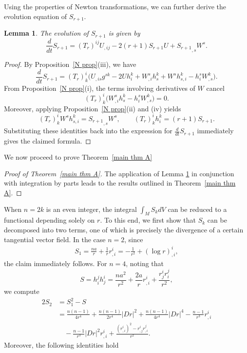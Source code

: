 \documentclass[reqno,11pt, letterpaper]{amsart}
\theoremstyle{plain}
\newtheorem{lem}[thm]{Lemma}
\theoremstyle{definition}
\numberwithin{equation}{section}
\begin{document}
Using the properties of Newton transformations, we can further derive the evolution equation of  $S_{r+1}$.
\begin{lem}\label{lem-evo-S}
	The evolution of $S_{r+1}$ is given by
	\[
	\frac{d}{dt} S_{r+1} = (T_r)^{ij} U_{,ij} - 2(r+1) S_{r+1} U + {S_{r+1}}_{,s} W^s.
	\]
\end{lem}
\begin{proof}
	By Proposition~\ref{N prop}(iii), we have
	\[
	\frac{d}{dt} S_{r+1} 
	= (T_r)^i_k \big(U_{,is} g^{sk} - 2U h_i^k + W^s_{,i} h_s^k + W^s h_{s,i}^k - h_i^s W^k_{,s}\big).
	\]
	From Proposition~\ref{N prop}(i), the terms involving derivatives of $W$ cancel
	\[
	(T_r)^i_k \big(W^s_{,i} h_s^k - h_i^s W^k_{,s}\big) = 0.
	\]
	Moreover, applying Proposition~\ref{N prop}(ii) and (iv) yields
	\[
	(T_r)^i_k W^s h_{s,i}^k = {S_{r+1}}_{,s} W^s, 
	\qquad (T_r)^i_k h_i^k = (r+1) S_{r+1}.
	\]
	Substituting these identities back into the expression for $\frac{d}{dt} S_{r+1}$ immediately gives the claimed formula.
\end{proof}
We now proceed to prove Theorem~\ref{main thm A}
\begin{proof}[Proof of Theorem~\ref{main thm A}]
	The application of Lemma \ref{lem-evo-S} in conjunction with integration by parts leads to the results outlined in Theorem~\ref{main thm A}.
\end{proof}
When $n = 2k$ is an even integer, the integral $\int_M S_kdV$
can be reduced to a functional depending solely on $r$. To this end, we first show that $S_k$ can be decomposed into two terms, one of which is precisely the divergence of a certain tangential vector field. In the case $n=2$, since
\begin{align*}
	S_1 = \frac{n a}{r} + \frac{1}{r} r^i_{,i} = -\frac{1}{r^2} + \left(\log r\right)^i_{,i},
\end{align*}
the claim immediately follows. For $n=4$, noting that
\[
S = h^j_i h^i_j = \frac{n a^2}{r^2} + \frac{2a}{r} r^i_{,i} + \frac{r^i_j r^j_i}{r^2},
\]
we compute
\begin{align*}
	2 S_2 &= S_1^2 - S \\
	&= \frac{n(n-1)}{4 r^4} + \frac{n(n-1)}{2 r^4} |Dr|^2 + \frac{n(n-1)}{4 r^4} |Dr|^4 - \frac{n-1}{r^3} r^i_{,i} \\
	&\quad - \frac{n-1}{r^3} |Dr|^2 r^i_{,i} + \frac{(r^i_{,i})^2 - r^i_{,j} r^j_{,i}}{r^2}.
\end{align*}
Moreover, the following identities hold
\end{document}

